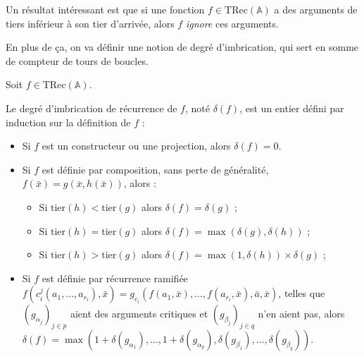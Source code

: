\documentclass{report}
\newcommand{\bbA}{\mathbb{A}}
\newcommand{\TRec}[1]{\text{TRec}\left(\mathbb{#1}\right)}
\begin{document}
			Un résultat intéressant est que si une fonction $f \in \TRec{\bbA}$ a des arguments de tiers inférieur à son tier d'arrivée, alors $f$ \emph{ignore} ces arguments.
			
			\espace 
			
			En plus de ça, on va définir une notion de degré d'imbrication, qui sert en somme de compteur de tours de boucles. 
			
			
			\begin{definition}
				\label{def:degre_recurrence}
				
				Soit $f \in \TRec{A}$. 
				
				
				Le degré d'imbrication de récurrence de $f$, noté $\delta(f)$, est un entier défini par induction sur la définition de $f$ :
				
				\begin{itemize}[itemsep=-1mm]
					\item 	Si $f$ est un constructeur ou une projection, alors $\delta(f) = 0$.
					\item 	Si $f$ est définie par composition, sans perte de généralité, $f(\bar{x}) = g\left( \bar{x}, h\left( \bar{x}\right)\right)$, alors :
					
							\begin{itemize}[itemsep=-1mm]
								\item 	Si $\text{tier}(h) < \text{tier}(g)$ alors $\delta(f) = \delta(g)$ ;
								\item 	Si $\text{tier}(h) = \text{tier}(g)$ alors $\delta(f) = \max\left(\delta(g), \delta(h)\right)$ ;
								\item 	Si $\text{tier}(h) > \text{tier}(g)$ alors $\delta(f) = \max\left(1, \delta(h)\right) \times \delta(g)$ ;
							\end{itemize}
							
					\item 	Si $f$ est définie par récurrence ramifiée $f(c_i^j(a_1, \dots, a_{r_i}), \bar{x}) = g_{c_i}\left( f(a_1, \bar{x}), \dots, f(a_{r_i}, \bar{x}), \bar{a}, \bar{x} \right)$, telles que $\left( g_{\alpha_j}\right)_{j\in p}$ aient des arguments critiques et $\left( g_{\beta_j}\right)_{j\in q}$ n'en aient pas, alors $\delta(f) = \max\left( 1 + \delta\left( g_{\alpha_1} \right), \dots,  1 + \delta\left( g_{\alpha_p} \right), \delta\left( g_{\beta_1} \right), \dots,  \delta\left( g_{\beta_q} \right)\right)$. 
				\end{itemize}
			\end{definition}
			
\end{document}

